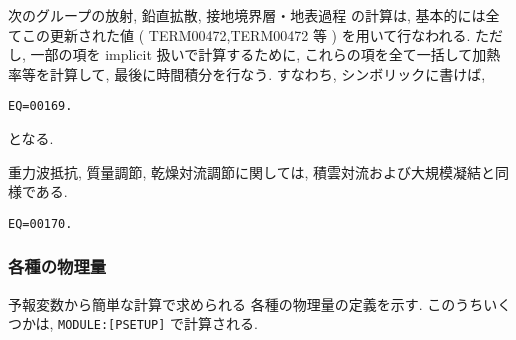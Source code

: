 次のグループの放射, 鉛直拡散, 接地境界層・地表過程
の計算は, 基本的には全てこの更新された値
( TERM00472,TERM00472 等 )
を用いて行なわれる.
ただし, 一部の項を implicit 扱いで計算するために,
これらの項を全て一括して加熱率等を計算して, 
最後に時間積分を行なう.
すなわち, シンボリックに書けば,
\begin{verbatim}
EQ=00169.
\end{verbatim}
となる.

重力波抵抗, 質量調節, 乾燥対流調節に関しては,
積雲対流および大規模凝結と同様である.
\begin{verbatim}
EQ=00170.
\end{verbatim}



\subsubsection{各種の物理量}

予報変数から簡単な計算で求められる
各種の物理量の定義を示す.
このうちいくつかは, 
\texttt{MODULE:[PSETUP]} で計算される.

